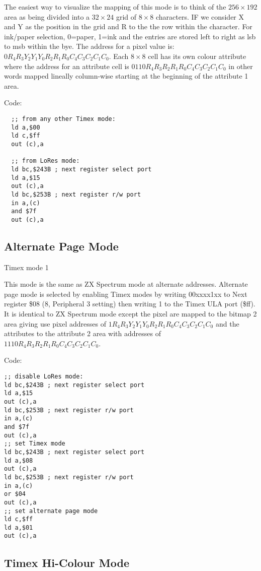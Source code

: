 The easiest way to visualize the mapping of this mode is to think of
the $256\times192$ area as being divided into a $32\times24$ grid of
$8\times8$ characters.  IF we consider X and Y as the position in the
grid and R to the the row within the character.  For ink/paper
selection, 0=paper, 1=ink and the entries are stored left to right as
lsb to msb within the bye.  The address for a pixel value is:
$0R_4R_3Y_2Y_1Y_0R_2R_1R_0C_4C_3C_2C_1C_0$. Each $8\times8$ cell has
its own colour attribute where the address for an attribute cell is
$0110R_4R_3R_2R_1R_0C_4C_3C_2C_1C_0$ in other words mapped lineally
column-wise starting at the beginning of the attribute 1 area.

Code:
\begin{verbatim}
  ;; from any other Timex mode:
  ld a,$00
  ld c,$ff
  out (c),a

  ;; from LoRes mode:
  ld bc,$243B ; next register select port
  ld a,$15
  out (c),a
  ld bc,$253B ; next register r/w port
  in a,(c)
  and $7f
  out (c),a
\end{verbatim}

\subsection{Alternate Page Mode}

Timex mode 1

This mode is the same as ZX Spectrum mode at alternate
addresses. Alternate page mode is selected by enabling Timex modes by
writing 00xxxx1xx to Next register \$08 (8, Peripheral 3 setting) then
writing 1 to the Timex ULA port (\$ff).  It is identical to ZX
Spectrum mode except the pixel are mapped to the bitmap 2 area giving
use pixel addresses of $1R_4R_3Y_2Y_1Y_0R_2R_1R_0C_4C_3C_2C_1C_0$ and
the attributes to the attribute 2 area with addresses of
$1110R_4R_3R_2R_1R_0C_4C_3C_2C_1C_0$.

Code:

\begin{verbatim}
;; disable LoRes mode:
ld bc,$243B ; next register select port
ld a,$15
out (c),a
ld bc,$253B ; next register r/w port
in a,(c)
and $7f
out (c),a
;; set Timex mode
ld bc,$243B ; next register select port
ld a,$08
out (c),a
ld bc,$253B ; next register r/w port
in a,(c)
or $04
out (c),a
;; set alternate page mode
ld c,$ff
ld a,$01
out (c),a
\end{verbatim}

\subsection{Timex Hi-Colour Mode}


